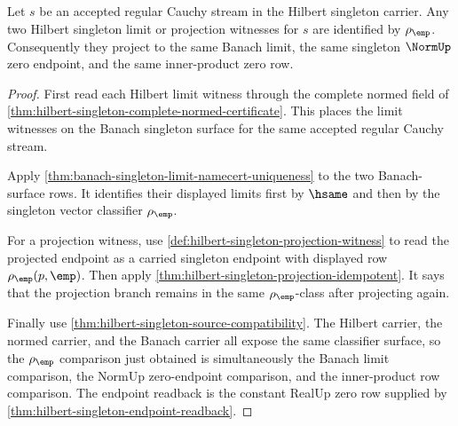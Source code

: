 \begin{theorem}
\label{thm:hilbert-singleton-projection-uniqueness}
Let $s$ be an accepted regular Cauchy stream in the Hilbert singleton carrier.
Any two Hilbert singleton limit or projection witnesses for $s$ are identified
by $\rho_{\emp}$. Consequently they project to the same Banach limit, the same
singleton $\NormUp$ zero endpoint, and the same inner-product zero row.
\end{theorem}
\begin{proof}
First read each Hilbert limit witness through the complete normed field of
\autoref{thm:hilbert-singleton-complete-normed-certificate}. This places the
limit witnesses on the Banach singleton surface for the same accepted regular
Cauchy stream.

Apply \autoref{thm:banach-singleton-limit-namecert-uniqueness} to the two
Banach-surface rows. It identifies their displayed limits first by $\hsame$
and then by the singleton vector classifier $\rho_{\emp}$.

For a projection witness, use
\autoref{def:hilbert-singleton-projection-witness} to read the projected
endpoint as a carried singleton endpoint with displayed row
$\rho_{\emp}(p,\emp)$. Then apply
\autoref{thm:hilbert-singleton-projection-idempotent}. It says that the
projection branch remains in the same $\rho_{\emp}$-class after projecting
again.

Finally use \autoref{thm:hilbert-singleton-source-compatibility}. The
Hilbert carrier, the normed carrier, and the Banach carrier all expose the
same classifier surface, so the $\rho_{\emp}$ comparison just obtained is
simultaneously the Banach limit comparison, the NormUp zero-endpoint
comparison, and the inner-product row comparison. The endpoint readback is the
constant RealUp zero row supplied by
\autoref{thm:hilbert-singleton-endpoint-readback}.
\end{proof}

